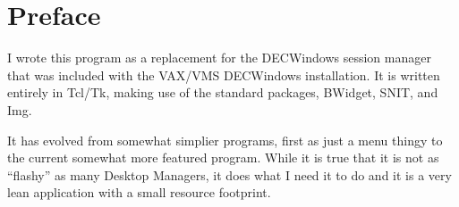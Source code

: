 \chapter*{Preface}
%
\label{chpt:Preface}

I wrote this program as a replacement for the DECWindows session manager
that was included with the VAX/VMS DECWindows installation.  It is 
written entirely in Tcl/Tk, making use of the standard packages,
BWidget, SNIT, and Img.

It has evolved from somewhat simplier programs, first as just a menu
thingy to the current somewhat more featured program.  While it is true
that it is not as ``flashy'' as many Desktop Managers, it does what I
need it to do and it is a very lean application with a small resource
footprint. 
